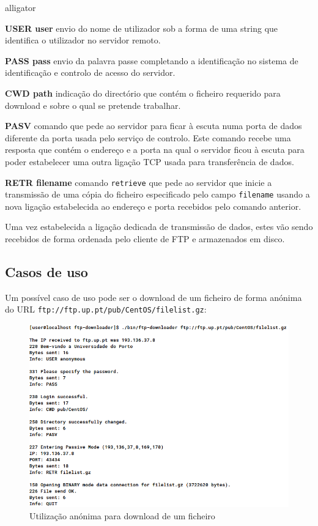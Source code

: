 \documentclass[a4paper,11pt,titlepage]{article}
\begin{document}
\begin{labeling}{alligator}
\item [\textbf{USER user}] envio do nome de utilizador sob a forma de uma string que identifica o utilizador no servidor remoto.
\item [\textbf{PASS pass}] envio da palavra passe completando a identificação no sistema de identificação e controlo de acesso do servidor.
\item [\textbf{CWD path}] indicação do directório que contém o ficheiro requerido para download e sobre o qual se pretende trabalhar.
\item [\textbf{PASV}] comando que pede ao servidor para ficar à escuta numa porta de dados diferente da porta usada pelo serviço de controlo. Este comando recebe uma resposta que contém o endereço e a porta na qual o servidor ficou à escuta para poder estabelecer uma outra ligação TCP usada para transferência de dados.
\item [\textbf{RETR filename}] comando \texttt{retrieve} que pede ao servidor que inicie a transmissão de uma cópia do ficheiro especificado pelo campo \texttt{filename} usando a nova ligação estabelecida ao endereço e porta recebidos pelo comando anterior.
\end{labeling}

Uma vez estabelecida a ligação dedicada de transmissão de dados, estes vão sendo recebidos de forma ordenada pelo cliente de FTP e armazenados em disco.

\subsection*{Casos de uso}
Um possível caso de uso pode ser o download de um ficheiro de forma anónima do URL \texttt{ftp://ftp.up.pt/pub/CentOS/filelist.gz}:

\begin{figure}[H]
    \center
    \includegraphics[scale=0.45]{res/anonymous.png}
    \caption{Utilização anónima para download de um ficheiro}
    \label{fig:anonymous.png}
\end{figure}
\end{document}
